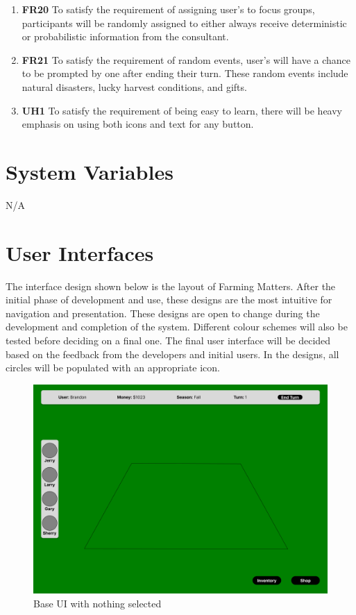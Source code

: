 \documentclass[12pt, titlepage]{article}
\begin{document}
\begin{enumerate}
    \item \textbf{FR20} To satisfy the requirement of assigning user's to focus groups, participants will be randomly assigned to either always receive deterministic or probabilistic information from the consultant.\\
    \item \textbf{FR21} To satisfy the requirement of random events, user's will have a chance to be prompted by one after ending their turn. These random events include natural disasters, lucky harvest conditions, and gifts.\\
    \item \textbf{UH1} To satisfy the requirement of being easy to learn, there will be heavy emphasis on using both icons and text for any button.\\
\end{enumerate}

\section{System Variables}
N/A

\section{User Interfaces}
The interface design shown below is the layout of Farming Matters. After the initial phase of development and use, these designs are the most intuitive for navigation and presentation. These designs are open to change during the development and completion of the system. Different colour schemes will also be tested before deciding on a final one. The final user interface will be decided based on the feedback from the developers and initial users. In the designs, all circles will be populated with an appropriate icon.


\begin{figure}[H]
\centering
\includegraphics[width=1\textwidth]{main.png}
\caption{Base UI with nothing selected}
\label{FigUH}
\end{figure}
\end{document}
